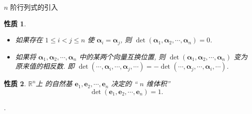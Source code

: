 \documentclass[10pt,punct]{ctexbeamer}
\newtheorem{pr3}{性质}
\begin{document}
    \begin{frame}{$n$ 阶行列式的引入}
        \begin{pr3}
            \begin{itemize}
                \item 如果存在 $1 \leqslant i<j \leqslant n$ 使 $\boldsymbol{\alpha}_i=\boldsymbol{\alpha}_j$, 则 $\operatorname{det}\left(\boldsymbol{\alpha}_1, \boldsymbol{\alpha}_2, \cdots, \boldsymbol{\alpha}_n\right)=0$.

                \item  如果将 $\boldsymbol{\alpha}_1, \boldsymbol{\alpha}_2, \cdots, \boldsymbol{\alpha}_n$ 中的某两个向量互换位置, 则 $\operatorname{det}\left(\boldsymbol{\alpha}_1, \boldsymbol{\alpha}_2, \cdots, \boldsymbol{\alpha}_n\right)$ 变为 原来值的相反数. 即
                $\operatorname{det}\left(\cdots, \boldsymbol{\alpha}_i, \cdots, \boldsymbol{\alpha}_j, \cdots\right)=-\operatorname{det}\left(\cdots, \boldsymbol{\alpha}_j, \cdots, \boldsymbol{\alpha}_i, \cdots\right)$.
            \end{itemize}
        \end{pr3}



        \begin{pr3}
            $\mathbb{R}^n$上 的自然基 $\boldsymbol{e}_1, \boldsymbol{e}_2, \cdots, \boldsymbol{e}_n$ 决定的 “ $n$ 维体积” $$\operatorname{det}\left( \boldsymbol{e}_1, \boldsymbol{e}_2, \cdots, \boldsymbol{e}_n\right)=1.$$
        \end{pr3}.
    \end{frame}
\end{document}
